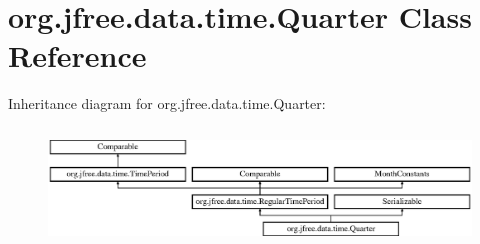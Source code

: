 \hypertarget{classorg_1_1jfree_1_1data_1_1time_1_1_quarter}{}\section{org.\+jfree.\+data.\+time.\+Quarter Class Reference}
\label{classorg_1_1jfree_1_1data_1_1time_1_1_quarter}
Inheritance diagram for org.\+jfree.\+data.\+time.\+Quarter\+:\begin{figure}[H]
\begin{center}
\leavevmode
\includegraphics[height=3.190883cm]{classorg_1_1jfree_1_1data_1_1time_1_1_quarter}
\end{center}
\end{figure}
